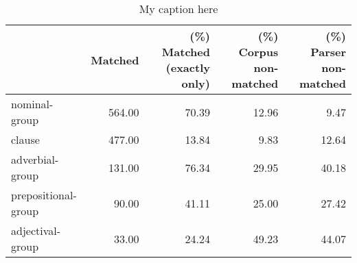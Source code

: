 \begin{table}[!ht]
\centering
\begin{tabular}{lrrrr}
\toprule
{} &  Matched &  (\%) Matched (exactly only) &  (\%) Corpus non-matched &  (\%) Parser non-matched \\
\midrule
nominal-group       &   564.00 &                       70.39 &                   12.96 &                    9.47 \\
clause              &   477.00 &                       13.84 &                    9.83 &                   12.64 \\
adverbial-group     &   131.00 &                       76.34 &                   29.95 &                   40.18 \\
prepositional-group &    90.00 &                       41.11 &                   25.00 &                   27.42 \\
adjectival-group    &    33.00 &                       24.24 &                   49.23 &                   44.07 \\
\bottomrule
\end{tabular}
\caption{My caption here}
\label{tab:unit-types-relative}
\end{table}